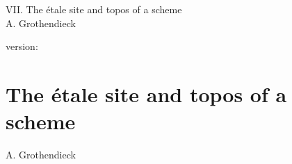 \documentclass[10pt]{../fichiers-configuration-latex/smfart}
\begin{document}
\begin{center}
VII. The étale site and topos of a scheme\\
A. Grothendieck
\end{center}

version: \showgitstatus
\tableofcontents

\else
\chapter{The étale site and topos of a scheme}
\begin{center}
A. Grothendieck
\end{center}
\fi
{}\label{sga4.exp.VII}






\end{document}
